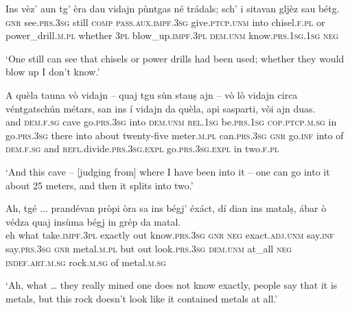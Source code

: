 \begin{linenumbers}
\gll Ins vèz’ aun tg’ èra dau vidajn pùntgas né trádals; sch’ i sitavan gljèz sau bétg.   \\
\textsc{gnr} see.\textsc{prs.3sg} still \textsc{comp} \textsc{pass.aux.impf.3sg} give.\textsc{ptcp.unm} into chisel.\textsc{f.pl} or power\_drill.\textsc{m.pl} whether \textsc{3pl} blow\_up.\textsc{impf.3pl} \textsc{dem.unm} know.\textsc{prs.1sg.1sg}  \textsc{neg}  \\
\end{linenumbers}
\medskip
\glt `One still can see that chisels or power drills had been used; whether they would blow up I don’t know.'
\medskip

\begin{linenumbers}
\gll A quèla tauna vò vidajn – quaj tgu sùn stauṣ ajn – vò lò vidajn circa véntgatschún métars, san ins í vidajn da quèla, api sasparti, vòi ajn duas.\\
and \textsc{dem.f.sg} cave go.\textsc{prs.3sg} into {}  \textsc{dem.unm} \textsc{rel.1sg} be.\textsc{prs.1sg} \textsc{cop.ptcp.m.sg} in {} go.\textsc{prs.3sg} there into about twenty-five meter.\textsc{m.pl} can.\textsc{prs.3sg} \textsc{gnr} go.\textsc{inf} into of \textsc{dem.f.sg} and \textsc{refl}.divide.\textsc{prs.3sg.expl} go.\textsc{prs.3sg.expl} in two.\textsc{f.pl}  \\
\end{linenumbers}
\medskip
\glt `And this cave – [judging from] where I have been into it – one can go into it about 25 meters, and then it splits into two.'
\medskip

\begin{linenumbers}
\gll   Ah, tgé ... prandévan pròpi òra sa ins bégj' éxáct, dí dian ins matalṣ, ábar ò védza quaj insùma bégj in grép da matal. \\
eh what {} take.\textsc{impf.3pl} exactly out know.\textsc{prs.3sg} \textsc{gnr} \textsc{neg} exact.\textsc{adj.unm} say.\textsc{inf} say.\textsc{prs.3sg} \textsc{gnr}  metal.\textsc{m.pl} but out look.\textsc{prs.3sg} \textsc{dem.unm} at\_all \textsc{neg} \textsc{indef.art.m.sg} rock.\textsc{m.sg} of metal.\textsc{m.sg}\\
\end{linenumbers}
\medskip
\glt `Ah, what … they really mined one does not know exactly, people say that it is metals, but this rock doesn't look like it contained metals at all.'
\medskip

